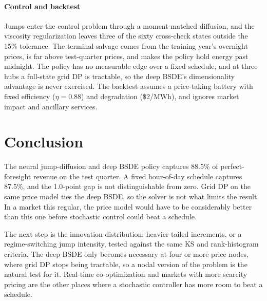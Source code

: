 \documentclass[11pt]{article}
\begin{document}
\paragraph{Control and backtest}
Jumps enter the control problem through a moment-matched diffusion, and
the viscosity regularization leaves three of the sixty cross-check states
outside the 15\% tolerance. The terminal salvage comes from the training
year's overnight prices, is far above test-quarter prices, and makes the
policy hold energy past midnight. The policy has no measurable edge over
a fixed schedule, and at three hubs a full-state grid DP is tractable, so
the deep BSDE's dimensionality advantage is never exercised. The backtest
assumes a price-taking battery with fixed efficiency ($\eta = 0.88$) and
degradation (\$2/MWh), and ignores market impact and ancillary services.

\section{Conclusion}

The neural jump-diffusion and deep BSDE policy captures 88.5\% of
perfect-foresight revenue on the test quarter. A fixed hour-of-day
schedule captures 87.5\%, and the 1.0-point gap is not distinguishable
from zero. Grid DP on the same price model ties the deep BSDE, so the
solver is not what limits the result. In a market this regular, the price
model would have to be considerably better than this one before
stochastic control could beat a schedule.

The next step is the innovation distribution: heavier-tailed increments,
or a regime-switching jump intensity, tested against the same KS and
rank-histogram criteria. The deep BSDE only becomes necessary at four or
more price nodes, where grid DP stops being tractable, so a nodal version
of the problem is the natural test for it. Real-time
co-optimization and markets with more scarcity pricing are the other
places where a stochastic controller has more room to beat a schedule.
\end{document}
